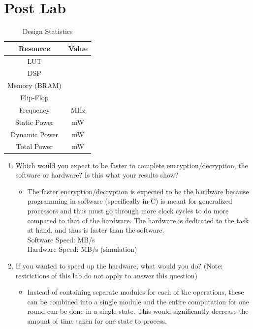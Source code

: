 \documentclass[journal, twocolumn, final,11pt,letterpaper]{IEEEtran}
\begin{document}
\section{Post Lab}
\begin{table}[htbp]
	\centering
	\begin{tabular}{c|c}	%
		\toprule	%
		Resource & Value \\
		\midrule
		LUT & \\
		DSP & \\
		Memory (BRAM) & \\
		Flip-Flop & \\
		Frequency &  MHz\\
		Static Power &  mW\\
		Dynamic Power & mW\\
		Total Power & mW\\
		\bottomrule	%
	\end{tabular}%
	\caption{Design Statistics}
	\label{tab:design}
\end{table}

\begin{enumerate}
	\item Which would you expect to be faster to complete encryption/decryption, the software or hardware? Is this what your results show?
	\begin{itemize}
		\item The faster encryption/decryption is expected to be the hardware because programming in software (specifically in C) is meant for generalized processors and thus must go through more clock cycles to do more compared to that of the hardware. The hardware is dedicated to the task at hand, and thus is faster than the software. \\
		
			\setlength{\leftskip}{24pt}Software Speed: MB/s \\
			Hardware Speed: MB/s (simulation)\\
			
	\end{itemize}
	\item If you wanted to speed up the hardware, what would you do? (Note: restrictions of this lab do not apply to answer this question)
	\begin{itemize}
		\item Instead of containing separate modules for each of the operations, these can be combined into a single module and the entire computation for one round can be done in a single state. This would significantly decrease the amount of time taken for one state to process. 
	\end{itemize}
\end{enumerate}
\end{document}
